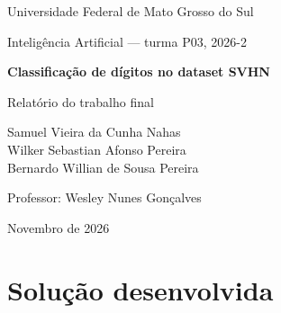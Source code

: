 \documentclass[11pt,a4paper]{article}
\begin{document}
\hypersetup{pageanchor=false}
\begin{titlepage}
  \centering
  {\large Universidade Federal de Mato Grosso do Sul\par}
  \vspace{0.5cm}
  {\large Inteligência Artificial --- turma P03, 2026-2\par}
  \vspace{4cm}
  {\LARGE\bfseries Classificação de dígitos no dataset SVHN\par}
  \vspace{0.5cm}
  {\large Relatório do trabalho final\par}
  \vspace{3cm}
  {\large Samuel Vieira da Cunha Nahas\\
          Wilker Sebastian Afonso Pereira\\
          Bernardo Willian de Sousa Pereira\par}
  \vspace{2cm}
  {\large Professor: Wesley Nunes Gonçalves\par}
  \vfill
  {\large Novembro de 2026\par}
\end{titlepage}
\hypersetup{pageanchor=true}

\begin{abstract}
Este relatório descreve a classificação dos dígitos do SVHN com redes neurais em PyTorch, usando só os
conjuntos \texttt{train} e \texttt{test}. Partimos de um classificador linear (\valLinear{} de validação) e de
uma MLP (\valMlp{}) e chegamos a uma CNN de três blocos com data augmentation, cutout, weight decay e label
smoothing (\valCnnBest{}). Toda escolha foi feita pela validação, numa divisão fixa do \texttt{train} com a
semente 42. A solução final é um ensemble de três Wide ResNets 28-2 com RandAugment, treinadas com
cosseno em 200 épocas e avaliadas com deslocamentos de 1 e 2 pixels (TTA). Ela tem \valFinal{} de validação e \testeFinal{} no teste,
e é o modelo que gerou as predições do conjunto adicional. As mudanças de maior impacto foram trocar a MLP pela
CNN, normalizar a entrada, usar data augmentation e combinar vários modelos.
\end{abstract}

\section{Solução desenvolvida}
\end{document}
